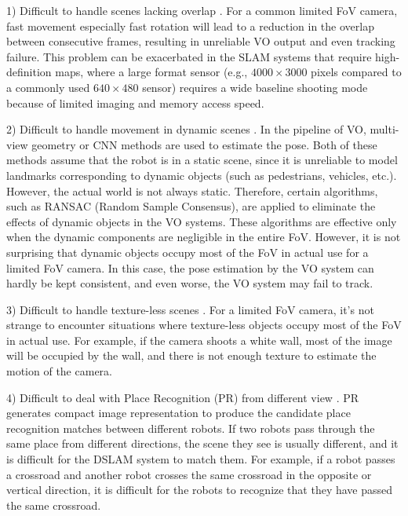 1) Difficult to handle scenes lacking overlap \cite{ji2020panoramic}.
For a common limited FoV camera, fast movement especially fast rotation will lead to a reduction in the overlap between consecutive frames, resulting in unreliable VO output and even tracking failure. 
This problem can be exacerbated in the SLAM systems that require high-definition maps, where a large format sensor (e.g., $4000 \times 3000$ pixels compared to a commonly used $640 \times 480$ sensor) requires a wide baseline shooting mode because of limited imaging and memory access speed.

2) Difficult to handle movement in dynamic scenes \cite{chen2019palvo}.
In the pipeline of VO, multi-view geometry or CNN methods are used to estimate the pose. 
Both of these methods assume that the robot is in a static scene, since it is unreliable to model landmarks corresponding to dynamic objects  (such as pedestrians, vehicles, etc.). 
However, the actual world is not always static.
Therefore, certain algorithms, such as RANSAC (Random Sample Consensus), are applied to eliminate the effects of dynamic objects in the VO systems.
These algorithms are effective only when the dynamic components are negligible in the entire FoV.
However, it is not surprising that dynamic objects occupy most of the FoV in actual use for a limited FoV camera.
In this case, the pose estimation by the VO system can hardly be kept consistent, and even worse, the VO system may fail to track.

3) Difficult to handle texture-less scenes \cite{hu2019indoor}.
For a limited FoV camera, it’s not strange to encounter situations where texture-less objects occupy most of the FoV in actual use.
For example, if the camera shoots a white wall, most of the image will be occupied by the wall, and there is not enough texture to estimate the motion of the camera.

4) Difficult to deal with Place Recognition (PR) from different view \cite{ji2020panoramic}.
PR generates compact image representation to produce the candidate place recognition matches between different robots.
If two robots pass through the same place from different directions, the scene they see is usually different, and it is difficult for the DSLAM system to match them.
For example, if a robot passes a crossroad and another robot crosses the same crossroad in the opposite or vertical direction, it is difficult for the robots to recognize that they have passed the same crossroad.

